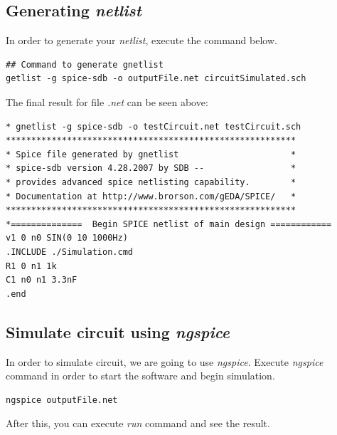 \documentclass{article}
\begin{document}
\subsection{Generating \textit{netlist}}

In order to generate your \textit{netlist}, execute the command below. \break

\begin{lstlisting}
## Command to generate gnetlist
getlist -g spice-sdb -o outputFile.net circuitSimulated.sch
\end{lstlisting} 

The final result for file \textit{.net} can be seen above: \break

\begin{lstlisting}
* gnetlist -g spice-sdb -o testCircuit.net testCircuit.sch
*********************************************************
* Spice file generated by gnetlist                      *
* spice-sdb version 4.28.2007 by SDB --                 *
* provides advanced spice netlisting capability.        *
* Documentation at http://www.brorson.com/gEDA/SPICE/   *
*********************************************************
*==============  Begin SPICE netlist of main design ============
v1 0 n0 SIN(0 10 1000Hz)
.INCLUDE ./Simulation.cmd
R1 0 n1 1k
C1 n0 n1 3.3nF
.end
\end{lstlisting} 

\subsection{Simulate circuit using \textit{ngspice}}

In order to simulate circuit, we are going to use \textit{ngspice}.
Execute \textit{ngspice} command in order to start the software and begin simulation. \break

\begin{lstlisting}
ngspice outputFile.net
\end{lstlisting} 

After this, you can execute \textit{run} command and see the result. \break
\end{document}
